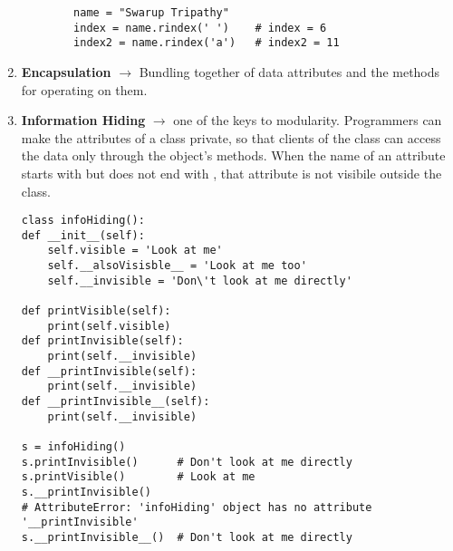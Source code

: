 \documentclass[11pt]{article}
\begin{document}
\begin{enumerate}
\begin{verbatim}
        name = "Swarup Tripathy"
        index = name.rindex(' ')    # index = 6
        index2 = name.rindex('a')   # index2 = 11
        \end{verbatim}
        \item \textbf{Encapsulation} $\rightarrow$ Bundling together of data attributes and the methods for operating on them.
        \item \textbf{Information Hiding} $\rightarrow$ one of the keys to modularity. Programmers can make the attributes of a class private, so that clients of the class can access the data only through the object's methods.
        When the name of an attribute starts with \textunderscore\textunderscore but does not end with \textunderscore\textunderscore, that attribute is not visibile outside the class.
        \begin{verbatim}
class infoHiding():
def __init__(self):
    self.visible = 'Look at me'
    self.__alsoVisisble__ = 'Look at me too'
    self.__invisible = 'Don\'t look at me directly'

def printVisible(self):
    print(self.visible)
def printInvisible(self):
    print(self.__invisible)
def __printInvisible(self):
    print(self.__invisible)
def __printInvisible__(self):
    print(self.__invisible)

s = infoHiding()
s.printInvisible()      # Don't look at me directly
s.printVisible()        # Look at me
s.__printInvisible()    
# AttributeError: 'infoHiding' object has no attribute '__printInvisible'
s.__printInvisible__()  # Don't look at me directly
        \end{verbatim}
    \end{enumerate}
\end{document}
